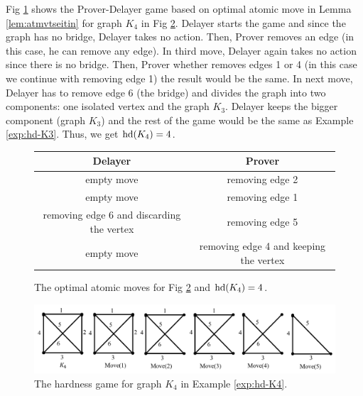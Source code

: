 \documentclass{report}
\begin{document}
\begin{examp}\label{exp:hd-K4}
Fig \ref{fig:game2} shows the Prover-Delayer game based on optimal atomic move in Lemma \ref{lem:atmvtseitin} for graph $K_4$ in Fig \ref{fig:hd2}. Delayer starts the game and since the graph has no bridge, Delayer takes no action. Then, Prover removes an edge (in this case, he can remove any edge). In third move, Delayer again takes no action since there is no bridge. Then, Prover whether removes edges 1 or 4 (in this case we continue with removing edge 1) the result would be the same. In next move, Delayer has to remove edge 6 (the bridge) and divides the graph into two components: one isolated vertex and the graph $K_3$. Delayer keeps the bigger component (graph $K_3$) and the rest of the game would be the same as Example \ref{exp:hd-K3}. Thus, we get $\operatorname{hd}(K_4)=4$.
  \begin{figure}%
  \centering
  \begin{tabular}{|c|c|} 
  \hline
                  Delayer & Prover \\ \hline
                  empty move & removing edge 2  \\ \hline
                  empty move & removing edge 1  \\ \hline
                  removing edge 6 and discarding the vertex & removing edge 5  \\ \hline
                  empty move & removing edge 4 and keeping the vertex\\ \hline
  \end{tabular}
  \caption{The optimal atomic moves for Fig \ref{fig:hd2} and  $\operatorname{hd}(K_4)=4$.} \label{fig:game2}
  \end{figure}
  \begin{figure}
  \begin{center}
  \includegraphics[scale =0.26]{g2.png}
  \caption{The hardness game for graph $K_4$ in Example \ref{exp:hd-K4}.}  \label{fig:hd2}
  \end{center}
  \end{figure}	   
\end{examp}
\end{document}
